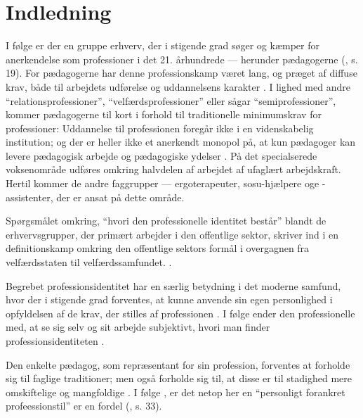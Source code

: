 \section{Indledning}

I følge \citeauthor{hansbolKonstruktionAfProfessionel2008} er der en gruppe erhverv, der i stigende grad søger og kæmper for anerkendelse som professioner i det 21. århundrede — herunder pædagogerne (\citeyear{hansbolKonstruktionAfProfessionel2008}, s. 19).
For pædagogerne har denne professionskamp været lang, og præget af diffuse krav, både til arbejdets udførelse og uddannelsens karakter \autocite[ss. 48-51] {kofodBornepolitikkenOgUdviklingen2007}.
I lighed med andre “relationsprofessioner”, “velfærdsprofessioner” eller sågar “semiprofessioner”, kommer pædagogerne til kort i forhold til traditionelle minimumskrav for professioner:
Uddannelse til professionen foregår ikke i en videnskabelig institution; og der er heller ikke et anerkendt monopol på, at kun pædagoger kan levere pædagogisk arbejde og pædagogiske ydelser \autocite[s.53]{kofodBornepolitikkenOgUdviklingen2007}.
På det specialserede voksenområde udføres omkring halvdelen af arbejdet af ufaglært arbejdskraft.
Hertil kommer de andre faggrupper — ergoterapeuter, sosu-hjælpere oge -assistenter, der er ansat på dette område.

Spørgsmålet omkring, “hvori den professionelle identitet består” blandt de erhvervsgrupper, der primært arbejder i den offentlige sektor, skriver \citeauthor{hansbolKonstruktionAfProfessionel2008} ind i en definitionskamp omkring den offentlige sektors formål i overgagnen fra velfærdsstaten til velfærdssamfundet.
\autocite[s. 19]{hansbolKonstruktionAfProfessionel2008}.

Begrebet professionsidentitet har en særlig betydning i det moderne samfund, hvor der i stigende grad forventes, at kunne anvende sin egen personlighed i opfyldelsen af de krav, der stilles af professionen \autocite{hansbolKonstruktionAfProfessionel2008}. I følge \citeauthor{mik-meyerIndledningSkabeProfessionel2012} ender den professionelle med, at se sig selv og sit arbejde subjektivt, hvori man finder professionsidentiteten \autocite[s. 458]{mik-meyerIndledningSkabeProfessionel2012}.

Den enkelte pædagog, som repræsentant for sin profession, forventes at forholde sig til faglige traditioner; men også forholde sig til, at disse er til stadighed mere omskiftelige og mangfoldige \autocite{hansbolKonstruktionAfProfessionel2008}. I følge \citeauthor{hansbolKonstruktionAfProfessionel2008}, er det netop her en “personligt forankret profeessionstil” er en fordel (\citeyear{hansbolKonstruktionAfProfessionel2008}, s. 33).

